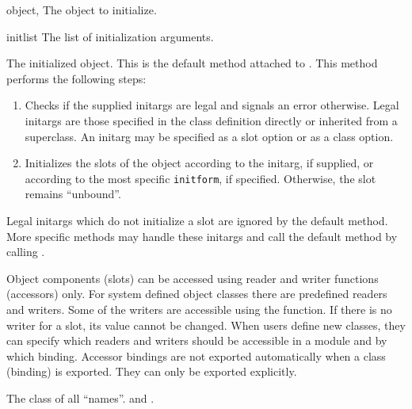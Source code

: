 \begin{optDefinition}
%
\begin{specargs}
    \item[object, \classref{object}] The object to initialize.
    \item[initlist] The list of initialization arguments.
\end{specargs}
%
\result%
The initialized object.
%
\remarks%
This is the default method attached to .  This method
performs the following steps:

\begin{enumerate}
    \item Checks if the supplied initargs are legal and signals an error
    otherwise. Legal initargs are those specified in the class definition
    directly or inherited from a superclass.  An initarg may be specified as a
    slot option or as a class option.

    \item Initializes the slots of the object according to the initarg, if
    supplied, or according to the most specific {\tt initform}, if specified.
    Otherwise, the slot remains ``unbound''.
\end{enumerate}
%
Legal initargs which do not initialize a slot are ignored by the default
 method.  More specific methods may handle these initargs
and call the default method by calling .
%
%
\end{optDefinition}

%
\begin{optDefinition}
Object components (slots) can be accessed using reader and writer functions
(accessors) only. For system defined object classes there are predefined readers
and writers. Some of the writers are accessible using the 
function. If there is no writer for a slot, its value cannot be changed. When
users define new classes, they can specify which readers and writers should be
accessible in a module and by which binding.  Accessor bindings are not exported
automatically when a class (binding) is exported. They can only be exported
explicitly.

%
%
The class of all ``names''.
%
\seealso%
 and .
%
\end{optDefinition}
